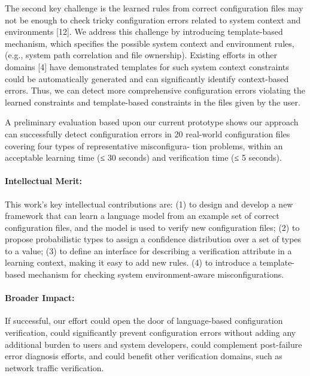 The second key challenge is the learned rules from correct configuration files may not be enough to check tricky configuration errors related to system context and environments [12]. 
We address this challenge by introducing template-based mechanism, which specifies the possible system context and environment rules, (e.g., system path correlation and file ownership).
Existing efforts in other domains [4] have demonstrated templates for such system context constraints could be automatically generated and can significantly identify context-based errors. 
Thus, we can detect more comprehensive configuration errors violating the learned constraints and template-based constraints in the files given by the user.

A preliminary evaluation based upon our current prototype shows our approach can successfully detect configuration errors in 20 real-world configuration files covering four types of representative misconfigura- tion problems, within an acceptable learning time (≤ 30 seconds) and verification time (≤ 5 seconds).

\paragraph{Intellectual Merit:} This work’s key intellectual contributions are: (1) to design and develop a new framework that can learn a language model from an example set of correct configuration files, and the model is used to verify new configuration files; (2) to propose probabilistic types to assign a confidence distribution over a set of types to a value; (3) to define an interface for describing a verification attribute in a learning context, making it easy to add new rules. 
(4) to introduce a template-based mechanism for checking system environment-aware misconfigurations.

\paragraph{Broader Impact:} If successful, our effort could open the door of language-based configuration verification, could significantly prevent configuration errors without adding any additional burden to users and system developers, could complement post-failure error diagnosis efforts, and could benefit other verification domains, such as network traffic verification. 

